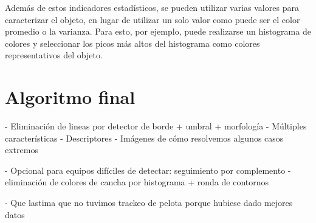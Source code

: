 Además de estos indicadores estadísticos, se pueden utilizar varias valores
para caracterizar el objeto, en lugar de utilizar un solo valor como puede ser
el color promedio o la varianza. Para esto, por ejemplo, puede realizarse un
histograma de colores y seleccionar los picos más altos del histograma como
colores representativos del objeto.


\section{Algoritmo final}
\label{sec:alg-final}

- Eliminación de lineas por detector de borde + umbral + morfología
- Múltiples características
- Descriptores
- Imágenes de cómo resolvemos algunos casos extremos

- Opcional para equipos difíciles de detectar: seguimiento por complemento
  - eliminación de colores de cancha por histograma + ronda de contornos

- Que lastima que no tuvimos trackeo de pelota porque hubiese dado mejores datos
